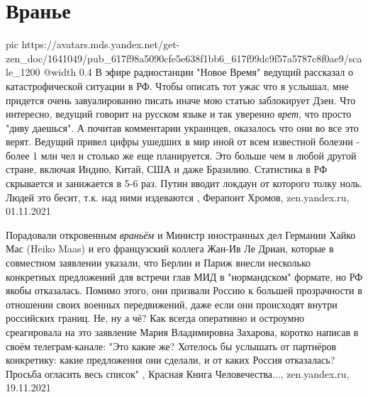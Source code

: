  
 
 
 
 
\chapter{Вранье}

\ifcmt
  pic https://avatars.mds.yandex.net/get-zen_doc/1641049/pub_617f98a5090cfe5e638f1bb6_617f99dc9f57a5787c8f0ae9/scale_1200
  @width 0.4
\fi
В эфире радиостанции "Новое Время" ведущий рассказал о катастрофической
ситуации в РФ. Чтобы описать тот ужас что я услышал, мне придется очень
завуалированно писать иначе мою статью заблокирует Дзен.  Что интересно,
ведущий говорит на русском языке и так уверенно \emph{врет}, что просто "диву
даешься". А почитав комментарии украинцев, оказалось что они во все это верят.
Ведущий привел цифры ушедших в мир иной от всем известной болезни - более 1 млн
чел и столько же еще планируется. Это больше чем в любой другой стране, включая
Индию, Китай, США и даже Бразилию.  Статистика в РФ скрывается и занижается в
5-6 раз. Путин вводит локдаун от которого толку ноль. Людей это бесит, т.к. над
ними издеваются
,
Ферапонт Хромов, zen.yandex.ru, 01.11.2021  

Порадовали откровенным \emph{враньём} и Министр иностранных дел Германии Хайко Мас
(Heiko Maas) и его французский коллега Жан-Ив Ле Дриан, которые в совместном
заявлении указали, что Берлин и Париж внесли несколько конкретных предложений
для встречи глав МИД в "нормандском" формате, но РФ якобы отказалась. Помимо
этого, они призвали Россию к большей прозрачности в отношении своих военных
передвижений, даже если они происходят внутри российских границ. Не, ну а чё?
Как всегда оперативно и остроумно среагировала на это заявление Мария
Владимировна Захарова, коротко написав в своём телеграм-канале: "Это какие же?
Хотелось бы услышать от партнёров конкретику: какие предложения они сделали, и
от каких Россия отказалась? Просьба огласить весь список"
, Красная Книга Человечества..., zen.yandex.ru, 19.11.2021
